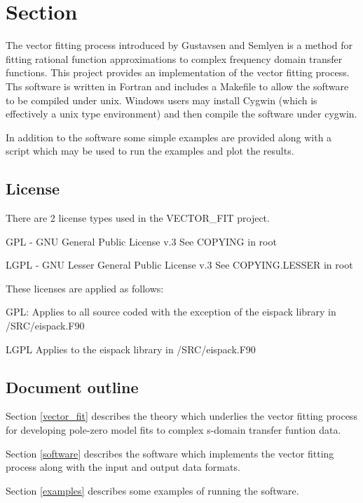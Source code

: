\section{Section}\label{introduction}

The vector fitting process introduced by Gustavsen and Semlyen \cite{vfit1} is a method for fitting rational function approximations to complex frequency domain transfer functions.
This project provides an implementation of the vector fitting process. Ths software is written in Fortran and includes a Makefile to allow the software to be compiled under unix. Windows users may install Cygwin (which is effectively a unix type environment) and then compile the software under cygwin. 

In addition to the software some simple examples are provided along with a script which may be used to run the examples and plot the results.  

\subsection{License}

There are 2 license types used in the VECTOR\_FIT project.

GPL - GNU General Public License v.3
See COPYING in root

LGPL - GNU Lesser General Public License v.3
See COPYING.LESSER in root

These licenses are applied as follows:

GPL: 
Applies to all source coded with the exception of the eispack library in /SRC/eispack.F90

LGPL
Applies to the eispack library in /SRC/eispack.F90

\subsection{Document outline}


Section \ref{vector_fit} describes the theory which underlies the vector fitting process for developing pole-zero model fits to complex s-domain transfer funtion data.

Section \ref{software} describes the software which implements the vector fitting process along with the input and output data formats.

Section \ref{examples} describes some examples of running the software.



